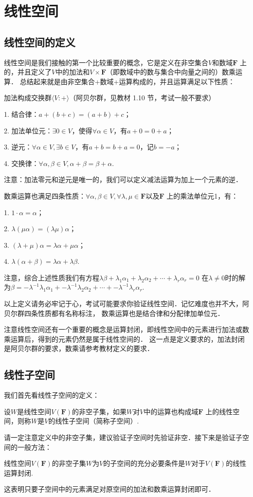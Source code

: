 \chapter{线性空间}

\section{线性空间的定义}
线性空间是我们接触的第一个比较重要的概念，它是定义在非空集合$V$和数域$\mathbf{F}$
上的，并且定义了$V$中的加法和$V\times \mathbf{F}$（即数域中的数与集合中向量之间的）数乘运算．
总结起来就是由非空集合+数域+运算构成的，并且运算满足以下性质：

加法构成交换群$\langle V:+\rangle$（阿贝尔群，见教材 1.10 节，考试一般不要求）

1. 结合律：$a+(b+c)=(a+b)+c$；

2. 加法单位元：$\exists 0 \in V$，使得$\forall\alpha\in V$，有$a+0=0+a$；

3. 逆元：$\forall\alpha\in V,\exists b\in V$，有$a+b=b+a=0$，记$b=-a$；

4. 交换律：$\forall\alpha,\beta\in V, \alpha+\beta=\beta+\alpha$.

注意：加法零元和逆元是唯一的，我们可以定义减法运算为加上一个元素的逆．

数乘运算也满足四条性质：$\forall \alpha,\beta \in V,\forall \lambda,\mu\in\mathbf{F}$以及$\mathbf{F}$
上的乘法单位元1，有：

1. $1\cdot \alpha=\alpha$；

2. $\lambda(\mu\alpha)=(\lambda\mu)\alpha$；

3. $(\lambda+\mu)\alpha=\lambda\alpha+\mu\alpha$；

4. $\lambda(\alpha+\beta)=\lambda\alpha+\lambda\beta$.

注意，综合上述性质我们有方程$\lambda\beta+\lambda_1\alpha_1+\lambda_2\alpha_2+\cdots+\lambda_r\alpha_r=0$
在$\lambda\neq 0$时的解为$\beta=-\lambda^{-1}\lambda_1\alpha_1+-\lambda^{-1}\lambda_2\alpha_2+\cdots+-\lambda^{-1}\lambda_r\alpha_r$.

以上定义请务必牢记于心，考试可能要求你验证线性空间．记忆难度也并不大，阿贝尔群四条性质都有名称标注，
数乘运算也是结合律和分配律加单位元．

注意线性空间还有一个重要的概念是运算封闭，即线性空间中的元素进行加法或数乘运算后，得到的元素仍然是属于线性空间的．
这一点是定义要求的，加法封闭是阿贝尔群的要求，数乘请参考教材定义的要求．

\section{线性子空间}
我们首先看线性子空间的定义：
\begin{definition}
	设$W$是线性空间$V(\mathbf{F})$的非空子集，如果$W$对$V$中的运算也构成域$\mathbf{F}$
	上的线性空间，则称$W$是$V$的线性子空间（简称子空间）.
\end{definition}
请一定注意定义中的非空子集，建议验证子空间时先验证非空．接下来是验证子空间的一般方法：
\begin{theorem}
	线性空间$V(\mathbf{F})$的非空子集$W$为$V$的子空间的充分必要条件是$W$对于$V(\mathbf{F})$的线性运算封闭.
\end{theorem}
这表明只要子空间中的元素满足对原空间的加法和数乘运算封闭即可．

